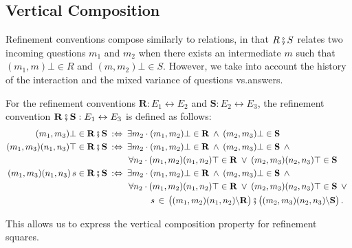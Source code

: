 \documentclass[acmsmall,screen,review,nonacm]{acmart}
\begin{document}

\subsection{Vertical Composition} %

Refinement conventions compose similarly to relations,
in that $R \fatsemi S$ relates
two incoming questions $m_1$ and $m_2$
when there exists an intermediate $m$ such that
$(m_1,m)\bot \in R$ and
$(m,m_2)\bot \in S$.
However,
we take into account
the history of the interaction and
the mixed variance of questions vs.\@ answers.

\begin{definition}
For the refinement conventions
$\mathbf{R} : E_1 \leftrightarrow E_2$ and
$\mathbf{S} : E_2 \leftrightarrow E_3$,
the refinement convention
$\mathbf{R \fatsemi S} : E_1 \leftrightarrow E_3$
is defined as follows:
\begin{align*}
  (m_1, m_3) \bot \in \mathbf{R} \fatsemi \mathbf{S} \: :\Leftrightarrow \: {}
   &\exists m_2 \cdot
      (m_1, m_2)\bot \in \mathbf{R} \:\wedge\:
      (m_2, m_3)\bot \in \mathbf{S}
  \\%
  (m_1, m_3) (n_1, n_3) \top \in \mathbf{R} \fatsemi \mathbf{S} \::\Leftrightarrow\: {}
   &\exists m_2 \cdot
      (m_1, m_2)\bot \in \mathbf{R} \:\wedge\:
      (m_2, m_3)\bot \in \mathbf{S} \:\wedge\: {} \\
   &\,\forall n_2 \cdot
      (m_1, m_2)(n_1, n_2)\top \in \mathbf{R} \:\vee\:
      (m_2, m_3)(n_2, n_3)\top \in \mathbf{S}
  \\%
  (m_1, m_3) (n_1, n_3) \, s \in \mathbf{R} \fatsemi \mathbf{S} \::\Leftrightarrow\: {}
   &\exists m_2 \cdot
      (m_1, m_2)\bot \in \mathbf{R} \:\wedge\:
      (m_2, m_3)\bot \in \mathbf{S} \:\wedge\: {} \\
   &\,\forall n_2 \cdot
      (m_1, m_2)(n_1, n_2)\top \in \mathbf{R} \:\vee\:
      (m_2, m_3)(n_2, n_3)\top \in \mathbf{S} \:\vee\: {} \\
   &\qquad \:\:\: s \,\in\,
      \bigl( (m_1, m_2) (n_1, n_2) \backslash \mathbf{R} \bigr) \fatsemi
      \bigl( (m_2, m_3) (n_2, n_3) \backslash \mathbf{S} \bigr)
  \,.
\end{align*}
\end{definition}

This allows us to express the vertical composition property
for refinement squares.
\end{document}
